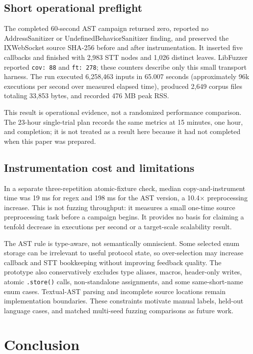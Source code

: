 \documentclass[conference]{IEEEtran}
\begin{document}
\subsection{Short operational preflight}

The completed 60-second AST campaign returned zero, reported no AddressSanitizer
or UndefinedBehaviorSanitizer finding, and preserved the IXWebSocket source
SHA-256 before and after instrumentation. It inserted five callbacks and
finished with 2,983 STT nodes and 1,026 distinct leaves. LibFuzzer reported
\texttt{cov: 88} and \texttt{ft: 278}; these counters describe only this small
transport harness. The run executed 6,258,463 inputs in 65.007 seconds
(approximately 96k executions per second over measured elapsed time), produced
2,649 corpus files totaling 33,853 bytes, and recorded 476 MB peak RSS.

This result is operational evidence, not a randomized performance comparison.
The 23-hour single-trial plan records the same metrics at 15 minutes, one hour,
and completion; it is not treated as a result here because it had not completed
when this paper was prepared.

\subsection{Instrumentation cost and limitations}

In a separate three-repetition atomic-fixture check, median copy-and-instrument
time was 19 ms for regex and 198 ms for the AST version, a 10.4$\times$
preprocessing increase. This is not fuzzing throughput: it measures a small
one-time source preprocessing task before a campaign begins. It provides no
basis for claiming a tenfold decrease in executions per second or a target-scale
scalability result.

The AST rule is type-aware, not semantically omniscient. Some selected enum
storage can be irrelevant to useful protocol state, so over-selection may
increase callback and STT bookkeeping without improving feedback quality. The
prototype also conservatively excludes type aliases, macros, header-only
writes, atomic \texttt{.store()} calls, non-standalone assignments, and some
same-short-name enum cases. Textual-AST parsing and incomplete source locations
remain implementation boundaries. These constraints motivate manual labels,
held-out language cases, and matched multi-seed fuzzing comparisons as future
work.

\section{Conclusion}
\end{document}
